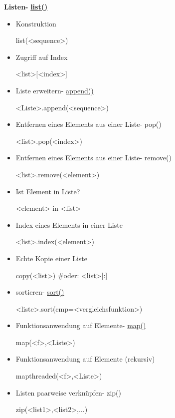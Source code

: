 \documentclass[a4paper,9pt,DIV15,twocolumn]{scrartcl}
\begin{document}
\textbf{Listen- } \href{http://docs.python.org/library/functions.html#list}{\textbf{list()}}
\begin{itemize}
 \item Konstruktion
\begin{sagein}
[a,b,c,...] 
list(<sequence>)
\end{sagein}
\item Zugriff auf Index
	\begin{sagein}
<list>[<index>]
	\end{sagein}

\item Liste erweitern- \href{https://sage.math.uni-goettingen.de/doc/static/reference/sage/misc/explain_pickle.html?highlight=append#sage.misc.explain_pickle.TestAppendList}{append()}
\begin{sagein}
<Liste>.append(<sequence>)
\end{sagein}
\item Entfernen eines Elements aus einer Liste- pop()
	\begin{sagein}
<list>.pop(<index>)
	\end{sagein}
\item Entfernen eines Elements aus einer Liste- remove()
	\begin{sagein}
<list>.remove(<element>)
	\end{sagein}	
\item Ist Element in Liste?
	\begin{sagein}
<element> in <list>
	\end{sagein}
\item Index eines Elements in einer Liste
	\begin{sagein}
<list>.index(<element>)
	\end{sagein}
\item Echte Kopie einer Liste
	\begin{sagein}
copy(<list>) #oder: <list>[:]
	\end{sagein}
\item sortieren- \href{https://sage.math.uni-goettingen.de/doc/static/reference/sage/structure/sequence.html?highlight=sort#sage.structure.sequence.Sequence_generic.sort}{sort()}
\begin{sagein}
 <liste>.sort(cmp=<vergleichsfunktion>)
\end{sagein}
\item Funktionsanwendung auf Elemente- \href{https://sage.math.uni-goettingen.de/doc/static/reference/sage/combinat/generator.html?highlight=map#sage.combinat.generator.map}{map()}
\begin{sagein}
 map(<f>,<Liste>)
\end{sagein}
\item Funktionsanwendung auf Elemente (rekursiv)
\begin{sagein}
 mapthreaded(<f>,<Liste>)
\end{sagein}
\item Listen paarweise verkn\"upfen- zip()
	\begin{sagein}
zip(<list1>,<list2>,$\ldots$)
	\end{sagein}
\end{itemize}
\end{document}
